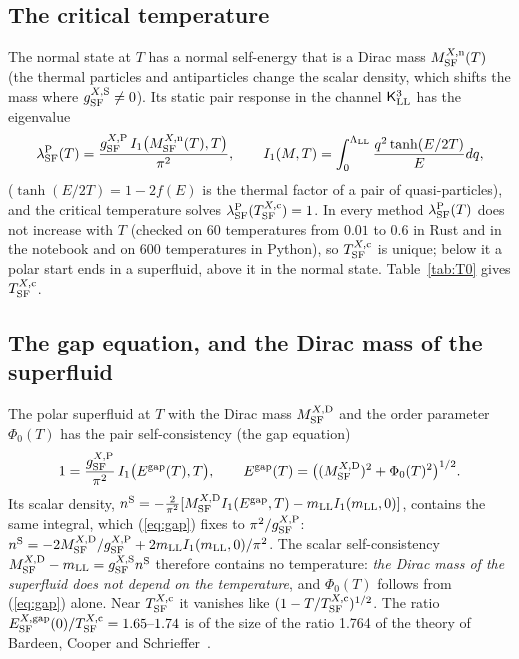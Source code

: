 \documentclass[aps,prd,onecolumn,superscriptaddress,nofootinbib,floatfix,longbibliography]{revtex4-2}
\newcommand{\LL}{{\rm LL}}
\newcommand{\SF}{{\rm SF}}
\begin{document}
\subsection{The critical temperature}

The normal state at $T$ has a normal self-energy that is a Dirac mass $M^{X,{\rm n}}_\SF(T)$ (the thermal particles and
antiparticles change the scalar density, which shifts the mass where $g^{X,{\rm S}}_\SF\ne0$). Its static pair response in the
channel $\mathsf K^3_\LL$ has the eigenvalue
\begin{equation}
\lambda^{\rm P}_\SF(T)=\frac{g^{X,{\rm P}}_\SF\,I_1\big(M^{X,{\rm n}}_\SF(T),T\big)}{\pi^2},\qquad I_1(M,T)=\int_0^{\Lambda_\LL}\frac{q^2\tanh(E/2T)}{E}dq,
\label{eq:lambdaT}
\end{equation}
($\tanh(E/2T)=1-2f(E)$ is the thermal factor of a pair of quasi-particles), and the critical temperature solves
$\lambda^{\rm P}_\SF(T^{X,{\rm c}}_\SF)=1$. In every method $\lambda^{\rm P}_\SF(T)$ does not increase with $T$ (checked on 60 temperatures from $0.01$
to $0.6$ in Rust and in the notebook and on 600 temperatures in Python), so $T^{X,{\rm c}}_\SF$ is unique; below it a polar start
ends in a superfluid, above it in the normal state. Table~\ref{tab:T0} gives $T^{X,{\rm c}}_\SF$.

\subsection{The gap equation, and the Dirac mass of the superfluid}

The polar superfluid at $T$ with the Dirac mass $M^{X,{\rm D}}_\SF$ and the order parameter $\Phi_0(T)$ has the pair self-consistency
(the gap equation)
\begin{equation}
1=\frac{g^{X,{\rm P}}_\SF}{\pi^2}\,I_1\big(E^{\rm gap}(T),T\big),\qquad E^{\rm gap}(T)=\big((M^{X,{\rm D}}_\SF)^2+\Phi_0(T)^2\big)^{1/2}.
\label{eq:gap}
\end{equation}
Its scalar density,
$n^{\rm S}=-\frac2{\pi^2}[M^{X,{\rm D}}_\SF I_1(E^{\rm gap},T)-m_\LL I_1(m_\LL,0)]$, contains the same integral, which (\ref{eq:gap}) fixes to
$\pi^2/g^{X,{\rm P}}_\SF$: $n^{\rm S}=-2M^{X,{\rm D}}_\SF/g^{X,{\rm P}}_\SF+2m_\LL I_1(m_\LL,0)/\pi^2$. The scalar self-consistency
$M^{X,{\rm D}}_\SF-m_\LL=g^{X,{\rm S}}_\SF n^{\rm S}$ therefore contains no temperature: \emph{the Dirac mass of the superfluid does not
depend on the temperature}, and $\Phi_0(T)$ follows from (\ref{eq:gap}) alone. Near $T^{X,{\rm c}}_\SF$ it vanishes like
$(1-T/T^{X,{\rm c}}_\SF)^{1/2}$. The ratio $E^{X,{\rm gap}}_\SF(0)/T^{X,{\rm c}}_\SF=1.65\mbox{--}1.74$ is of the size of the ratio 1.764 of the
theory of Bardeen, Cooper and Schrieffer~\cite{BCS1957}.
\end{document}
